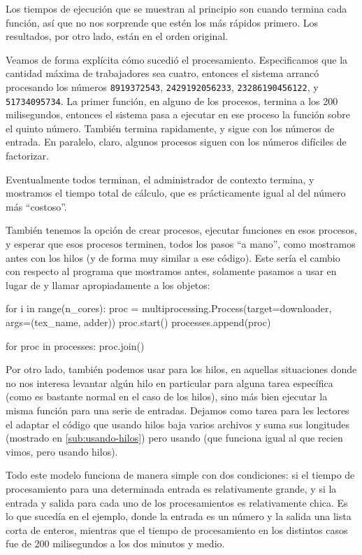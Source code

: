 Los tiempos de ejecución que se muestran al principio son cuando termina cada función, así que no nos sorprende que estén los más rápidos primero. Los resultados, por otro lado, están en el orden original.

Veamos de forma explícita cómo sucedió el procesamiento. Especificamos que la cantidad máxima de trabajadores sea cuatro, entonces el sistema arrancó procesando los números \texttt{8919372543}, \texttt{2429192056233}, \texttt{23286190456122}, y \texttt{51734095734}. La primer función, en alguno de los procesos, termina a los 200 milisegundos, entonces el sistema pasa a ejecutar en ese proceso la función sobre el quinto número. También termina rapidamente, y sigue con los números de entrada. En paralelo, claro, algunos procesos siguen con los números difíciles de factorizar.

Eventualmente todos terminan, el administrador de contexto termina, y mostramos el tiempo total de cálculo, que es prácticamente igual al del número más ``costoso''. 

También tenemos la opción de crear procesos, ejecutar funciones en esos procesos, y esperar que esos procesos terminen, todos los pasos ``a mano'', como mostramos antes con los hilos (y de forma muy similar a ese código). Este sería el cambio con respecto al programa que mostramos antes, solamente pasamos a usar  en lugar de  y llamar apropiadamente a los objetos:

\begin{py}
for i in range(n_cores):
    proc = multiprocessing.Process(target=downloader, args=(tex_name, adder))
    proc.start()
    processes.append(proc)

for proc in processes:
    proc.join()
\end{py}

Por otro lado, también podemos usar  para los hilos, en aquellas situaciones donde no nos interesa levantar algún hilo en particular para alguna tarea específica (como es bastante normal en el caso de los hilos), sino más bien ejecutar la misma función para una serie de entradas. Dejamos como tarea para les lectores el adaptar el código que usando hilos baja varios archivos y suma sus longitudes (mostrado en \ref{sub:usando-hilos}) pero usando  (que funciona igual al  que recien vimos, pero usando hilos).

Todo este modelo funciona de manera simple con dos condiciones: si el tiempo de procesamiento para una determinada entrada es relativamente grande, y si la entrada y salida para cada uno de los procesamientos es relativamente chica. Es lo que sucedía en el ejemplo, donde la entrada es un número y la salida una lista corta de enteros, mientras que el tiempo de procesamiento en los distintos casos fue de 200 milisegundos a los dos minutos y medio.

